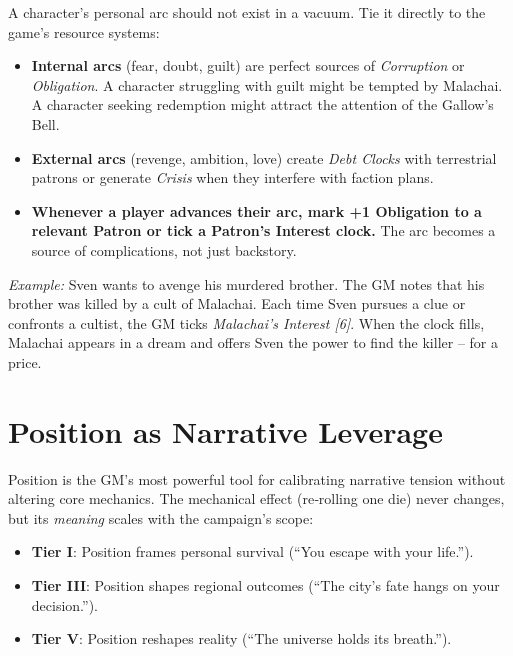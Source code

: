 \begin{tcolorbox}[colback=green!5!white, colframe=green!75!black, title=Arcs Generate Obligation and Patron Interest]
  A character’s personal arc should not exist in a vacuum. Tie it directly to the game’s resource systems:
  \begin{itemize}
    \item \textbf{Internal arcs} (fear, doubt, guilt) are perfect sources of \textit{Corruption} or \textit{Obligation}. A character struggling with guilt might be tempted by Malachai. A character seeking redemption might attract the attention of the Gallow’s Bell.
    \item \textbf{External arcs} (revenge, ambition, love) create \textit{Debt Clocks} with terrestrial patrons or generate \textit{Crisis} when they interfere with faction plans.
    \item \textbf{Whenever a player advances their arc, mark +1 Obligation to a relevant Patron or tick a Patron’s Interest clock.} The arc becomes a source of complications, not just backstory.
  \end{itemize}
  \textit{Example:} Sven wants to avenge his murdered brother. The GM notes that his brother was killed by a cult of Malachai. Each time Sven pursues a clue or confronts a cultist, the GM ticks \emph{Malachai’s Interest [6]}. When the clock fills, Malachai appears in a dream and offers Sven the power to find the killer – for a price.
\end{tcolorbox}

\section{Position as Narrative Leverage}
\label{sec:position-narrative}

Position is the GM’s most powerful tool for calibrating narrative tension without altering core mechanics. The mechanical effect (re‑rolling one die) never changes, but its \emph{meaning} scales with the campaign’s scope:
\begin{itemize}
  \item \textbf{Tier I}: Position frames personal survival (“You escape with your life.”).
  \item \textbf{Tier III}: Position shapes regional outcomes (“The city’s fate hangs on your decision.”).
  \item \textbf{Tier V}: Position reshapes reality (“The universe holds its breath.”).
\end{itemize}

